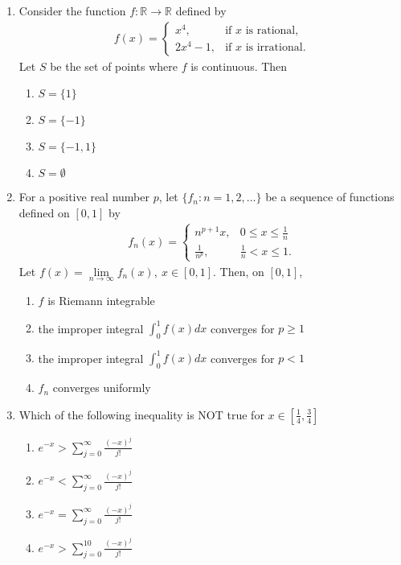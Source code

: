\documentclass[journal]{IEEEtran}
\numberwithin{equation}{enumi}
\numberwithin{figure}{enumi}
\begin{document}
\begin{enumerate}
\item Consider the function $f \colon \mathbb{R} \to \mathbb{R}$ defined by
\begin{align*}
f(x) = 
\begin{cases}
x^4, & \text{if } x \text{ is rational}, \\
2x^4 - 1, & \text{if } x \text{ is irrational}.
\end{cases}
\end{align*}
Let $S$ be the set of points where $f$ is continuous. Then
\hfill{}
\begin{multicols}{4}
\begin{enumerate}
    \item $S = \{1\}$
    \item $S = \{-1\}$
    \item $S = \{-1, 1\}$
    \item $S = \emptyset$
\end{enumerate}
\end{multicols}


\item For a positive real number $p$, let $\{f_n: n=1,2,\dots\}$ be a sequence of functions defined on $[0,1]$ by
\begin{align*}
f_n(x) =
\begin{cases}
n^{p+1} x, & 0 \leq x \leq \frac{1}{n} \\
\frac{1}{n^p}, & \frac{1}{n} < x \leq 1.
\end{cases}
\end{align*}
Let $f(x) = \lim\limits_{n \to \infty} f_n(x),\ x \in [0,1]$. Then, on $[0,1]$,
\hfill{}
\begin{enumerate}
    
\item $f$ is Riemann integrable \hspace{2cm}
\item the improper integral $\int_0^1 f(x) dx$ converges for $p \geq 1$ 
\item the improper integral $\int_0^1 f(x) dx$ converges for $p < 1$ \hspace{2cm}
\item $f_n$ converges uniformly
\end{enumerate}


\item Which of the following inequality is NOT true for $x \in \left[ \frac{1}{4}, \frac{3}{4} \right]$
\hfill{}
\begin{multicols}{2}
\begin{enumerate}
\item  $e^{-x} > \sum_{j=0}^{\infty} \frac{(-x)^j}{j!}$ \hspace{2cm}
\item $e^{-x} < \sum_{j=0}^{\infty} \frac{(-x)^j}{j!}$ \\
\item $e^{-x} = \sum_{j=0}^{\infty} \frac{(-x)^j}{j!}$ \hspace{2cm}
\item $e^{-x} > \sum_{j=0}^{10} \frac{(-x)^j}{j!}$
\end{enumerate}
\end{multicols}


\end{enumerate}
\end{document}
